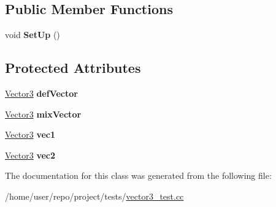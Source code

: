 \subsection*{Public Member Functions}
\begin{DoxyCompactItemize}
\item 
\mbox{\label{classVectorTest_a1ff1a928383c764e73a3c9c6118086bf}} 
void {\bfseries Set\+Up} ()
\end{DoxyCompactItemize}
\subsection*{Protected Attributes}
\begin{DoxyCompactItemize}
\item 
\mbox{\label{classVectorTest_a471f0a4b96f4cc6f9f221f652875a3ef}} 
\hyperlink{classVector3}{Vector3} {\bfseries def\+Vector}
\item 
\mbox{\label{classVectorTest_ad208dff0b2fdef9e3b61f5d13cb44989}} 
\hyperlink{classVector3}{Vector3} {\bfseries mix\+Vector}
\item 
\mbox{\label{classVectorTest_aa5413f07874ec4e4fceeb9f9ee6a2477}} 
\hyperlink{classVector3}{Vector3} {\bfseries vec1}
\item 
\mbox{\label{classVectorTest_aa8593ab75d8af532271de83fc4fc8e47}} 
\hyperlink{classVector3}{Vector3} {\bfseries vec2}
\end{DoxyCompactItemize}


The documentation for this class was generated from the following file\+:\begin{DoxyCompactItemize}
\item 
/home/user/repo/project/tests/\hyperlink{vector3__test_8cc}{vector3\+\_\+test.\+cc}\end{DoxyCompactItemize}
